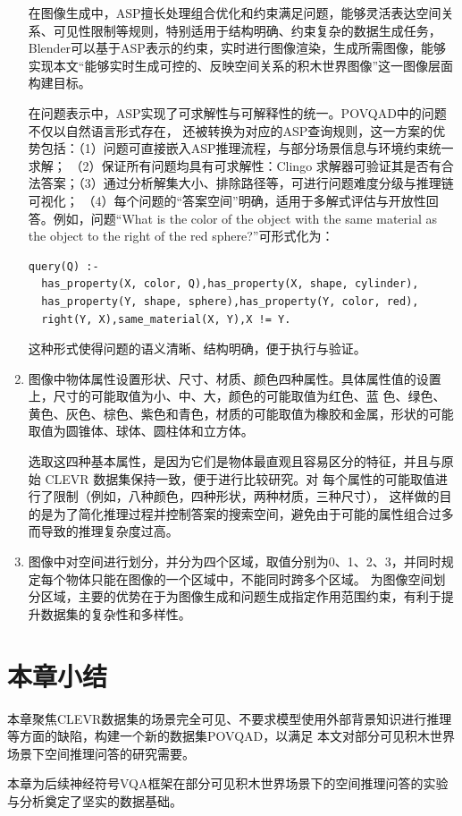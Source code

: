 \begin{enumerate}[nosep]
在图像生成中，ASP擅长处理组合优化和约束满足问题，能够灵活表达空间关系、可见性限制等规则，特别适用于结构明确、约束复杂的数据生成任务，
Blender可以基于ASP表示的约束，实时进行图像渲染，生成所需图像，能够实现本文“能够实时生成可控的、反映空间关系的积木世界图像”这一图像层面构建目标。

在问题表示中，ASP实现了可求解性与可解释性的统一。POVQAD中的问题不仅以自然语言形式存在，
还被转换为对应的ASP查询规则，这一方案的优势包括：（1）问题可直接嵌入ASP推理流程，与部分场景信息与环境约束统一求解；
（2）保证所有问题均具有可求解性：Clingo 求解器可验证其是否有合法答案；（3）通过分析解集大小、排除路径等，可进行问题难度分级与推理链可视化；
（4）每个问题的“答案空间”明确，适用于多解式评估与开放性回答。例如，问题“What is the color of the object with the same material as the object to the right of the red sphere?”可形式化为：
\begin{lstlisting}
query(Q) :-
  has_property(X, color, Q),has_property(X, shape, cylinder),
  has_property(Y, shape, sphere),has_property(Y, color, red),
  right(Y, X),same_material(X, Y),X != Y.
\end{lstlisting}
这种形式使得问题的语义清晰、结构明确，便于执行与验证。
\item 图像中物体属性设置形状、尺寸、材质、颜色四种属性。具体属性值的设置上，尺寸的可能取值为小、中、大，颜色的可能取值为红色、蓝
色、绿色、黄色、灰色、棕色、紫色和青色，材质的可能取值为橡胶和金属，形状的可能取值为圆锥体、球体、圆柱体和立方体。

选取这四种基本属性，是因为它们是物体最直观且容易区分的特征，并且与原始 CLEVR 数据集保持一致，便于进行比较研究。对
每个属性的可能取值进行了限制（例如，八种颜色，四种形状，两种材质，三种尺寸），
这样做的目的是为了简化推理过程并控制答案的搜索空间，避免由于可能的属性组合过多而导致的推理复杂度过高。
\item 图像中对空间进行划分，并分为四个区域，取值分别为0、1、2、3，并同时规定每个物体只能在图像的一个区域中，不能同时跨多个区域。
为图像空间划分区域，主要的优势在于为图像生成和问题生成指定作用范围约束，有利于提升数据集的复杂性和多样性。
\end{enumerate}

\section{本章小结}
本章聚焦CLEVR数据集的场景完全可见、不要求模型使用外部背景知识进行推理等方面的缺陷，构建一个新的数据集POVQAD，以满足
本文对部分可见积木世界场景下空间推理问答的研究需要。

本章为后续神经符号VQA框架在部分可见积木世界场景下的空间推理问答的实验与分析奠定了坚实的数据基础。